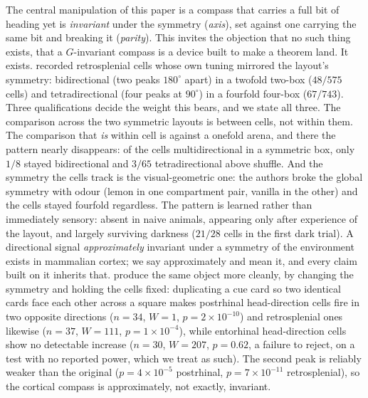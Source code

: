 The central manipulation of this paper is a compass that carries a full bit of heading yet is
\emph{invariant} under the symmetry (\textit{axis}), set against one carrying the same bit and breaking
it (\textit{parity}). This invites the objection that no such thing exists, that a $G$-invariant compass
is a device built to make a theorem land. It exists. \citet{zhang2022} recorded retrosplenial cells whose own
tuning mirrored the layout's symmetry: bidirectional (two peaks $180^\circ$ apart) in a twofold two-box
($48/575$ cells) and tetradirectional (four peaks at $90^\circ$) in a fourfold four-box ($67/743$).
Three qualifications decide the weight this bears, and we state all three. The comparison across the two
symmetric layouts is between cells, not within them. The comparison that \emph{is} within cell is
against a onefold arena, and there the pattern nearly disappears: of the cells multidirectional in a
symmetric box, only $1/8$ stayed bidirectional and $3/65$ tetradirectional above shuffle. And the
symmetry the cells track is the visual-geometric one: the authors broke the global symmetry with odour
(lemon in one compartment pair, vanilla in the other) and the cells stayed fourfold regardless. The
pattern is learned rather than immediately sensory: absent in naive animals, appearing only after
experience of the layout, and largely surviving darkness ($21/28$ cells in the first dark trial). A
directional signal \emph{approximately} invariant under a symmetry of the environment exists in
mammalian cortex; we say approximately and mean it, and every claim built on it inherits that.
\citet{lachance2024} produce the same object more cleanly, by changing the symmetry and holding the
cells fixed: duplicating a cue card so two identical cards face each other across a square makes
postrhinal head-direction cells fire in two opposite directions ($n = 34$, $W = 1$,
$p = 2\times10^{-10}$) and retrosplenial ones likewise ($n = 37$, $W = 111$, $p = 1\times10^{-4}$),
while entorhinal head-direction cells show no detectable increase ($n = 30$, $W = 207$, $p = 0.62$, a
failure to reject, on a test with no reported power, which we treat as such). The second peak is
reliably weaker than the original ($p = 4\times10^{-5}$ postrhinal, $p = 7\times10^{-11}$
retrosplenial), so the cortical compass is approximately, not exactly, invariant.

